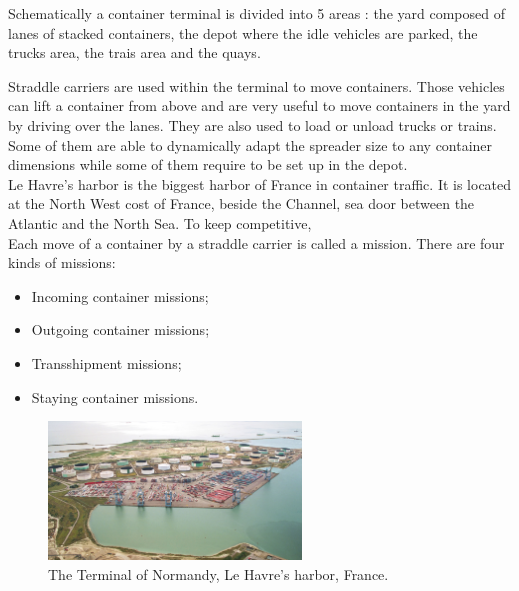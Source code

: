 \documentclass[a4paper,10pt]{article}
\begin{document}
Schematically a container terminal is divided into 5 areas : the yard composed of lanes of stacked containers, the depot where the idle vehicles are parked, the trucks area, the trais area and the quays.

Straddle carriers are used within the terminal to move containers. Those vehicles can lift a container from above and are very useful to move containers in the yard by driving over the lanes. They are also used to load or unload trucks or trains. Some of them are able to dynamically adapt the spreader size to any container dimensions while some of them require to be set up in the depot.\\%


Le Havre’s harbor is the biggest harbor of France in container traffic. It is located at the North West cost of France, beside the Channel, sea door between the Atlantic and the North Sea. To keep competitive, \\



Each move of a container by a straddle carrier is called a mission. There are four kinds of missions:
\begin{itemize}
	\item Incoming container missions;
	\item Outgoing container missions;
	\item Transshipment missions;
	\item Staying container missions.
\end{itemize}

\begin{figure}[ht]
  \begin{center}
  \includegraphics[width=0.6\textwidth]{Figures/terminalOfNormandy}
  \caption{The Terminal of Normandy, Le Havre's harbor, France.}
\end{center}
\end{figure}
\end{document}
